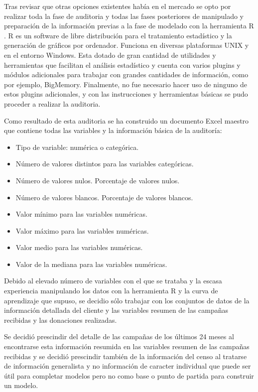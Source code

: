 Tras revisar que otras opciones existentes había en el mercado se opto por realizar toda la fase de auditoria y todas las fases posteriores de manipulado y preparación de la información previas a la fase de modelado con la herramienta R \cite{R}. R es un software de libre distribución para el tratamiento estadístico y la generación de gráficos por ordenador. Funciona en diversas plataformas UNIX y en el entorno Windows. Esta dotado de gran cantidad de utilidades y herramientas que facilitan el análisis estadístico y cuenta con varios plugins y módulos adicionales para trabajar con grandes cantidades de información, como por ejemplo, BigMemory.
Finalmente, no fue necesario hacer uso de ninguno de estos plugins adicionales, y con las instrucciones y herramientas básicas se pudo proceder a realizar la auditoria.

Como resultado de esta auditoria se ha construido un documento Excel maestro que contiene todas las variables y la información básica de la auditoría: 

\begin{itemize}

\item{Tipo de variable: numérica o categórica.}
\item{Número de valores distintos para las variables categóricas.}
\item{Número de valores nulos. Porcentaje de valores nulos.}
\item{Número de valores blancos. Porcentaje de valores blancos.}
\item{Valor mínimo para las variables numéricas.}
\item{Valor máximo para las variables numéricas.}
\item{Valor medio para las variables numéricas.}
\item{Valor de la mediana para las variables numéricas.}

\end{itemize}

Debido al elevado número de variables con el que se trataba y la escasa experiencia manipulando los datos con la herramienta R y la curva de aprendizaje que supuso, se decidio sólo trabajar con los conjuntos de datos de la información detallada del cliente y las variables resumen de las campañas recibidas y las donaciones realizadas.

Se decidió prescindir del detalle de las campañas de los últimos 24 meses al encontrarse esta información resumida en las variables resumen de las campañas recibidas y se decidió prescindir también de la información del censo al tratarse de información generalista y no información de caracter individual que puede ser útil para completar modelos pero no como base o punto de partida para construir un modelo.

